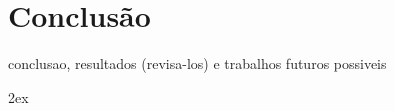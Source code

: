 \chapter{Conclusão} \label{cap:c}

conclusao,
resultados (revisa-los)
e trabalhos futuros possiveis

     \newpage
     \begingroup
     \parindent 0pt
     \parskip 2ex
     \def\enotesize{\normalsize}
     \theendnotes
     \endgroup
